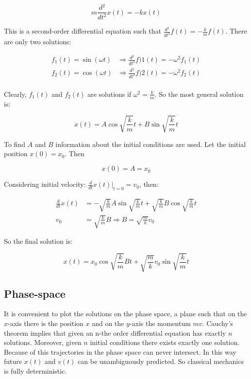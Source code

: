   $$m \frac{d{^2}}{d{t^2}}x(t) = -kx(t)$$

  This is a second-order differential equation such that $\frac{d{^2}}{d{t^2}}f(t) = -\frac{k}{m}f(t)$.
  There are only two solutions:

  \begin{align*}
    f_1(t) = \sin(\omega t) &\Rightarrow \frac{d{^2}}{d{t^2}}f)1(t) = -\omega^2f_1(t)\\
    f_2(t) = \cos(\omega t) &\Rightarrow \frac{d{^2}}{d{t^2}}f)2(t) = -\omega^2f_2(t)\\
  \end{align*}

  Clearly, $f_1(t)$ and $f_2(t)$ are solutions if $\omega^2 = \frac{k}{m}$.
  So the most general solution is:

  $$x(t) = A\cos\sqrt{\frac{k}{m}}t+B\sin\sqrt{\frac{k}{m}}t$$

  To find $A$ and $B$ information about the initial conditions are used.
  Let the initial position $x(0) = x_0$.
  Then 

  $$x(0) = A = x_0$$

  Considering initial velocity: $\frac{d{}}{d{t}}x(t)|_{t=0} = v_0$, then:

  \begin{align*}
    \frac{d{}}{d{t}}x(t) &= -\sqrt{\frac{k}{m}}A\sin\sqrt{\frac{k}{m}}t + \sqrt{\frac{k}{m}}B\cos\sqrt{\frac{k}{m}}t\\
    v_0 &= \sqrt{\frac{k}{m}} B \Rightarrow B = \sqrt{\frac{m}{k}}v_0
  \end{align*}

  So the final solution is:

  $$x(t) = x_0\cos\sqrt{\frac{k}{m}}Bt+\sqrt{\frac{m}{k}}v_0\sin\sqrt{\frac{k}{m}}t$$

  \subsection{Phase-space}
  It is convenient to plot the solutions on the phase space, a plane such that on the $x$-axis there is the position $x$ and on the $y$-axis the momentum $mv$.
  Cauchy's theorem implies that given an n-the order differential equation has exactly $n$ solutions.
  Moreover, given $n$ initial conditions there exists exactly one solution.
  Because of this trajectories in the phase space can never intersect.
  In this way future $x(t)$ and $v(t)$ can be unambiguously predicted.
  So classical mechanics is fully deterministic.

